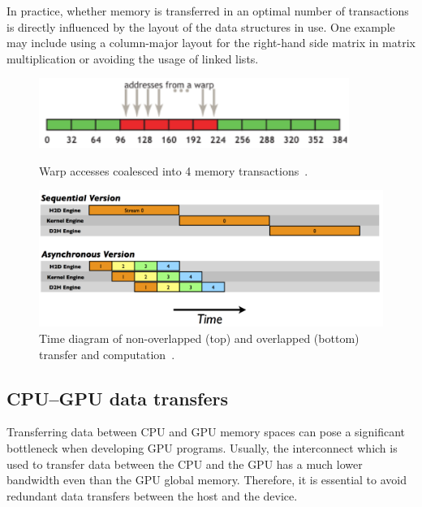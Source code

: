 In practice, whether memory is transferred in an optimal number of transactions is directly influenced by the layout of the data structures in use. One example may include using a column-major layout for the right-hand side matrix in matrix multiplication or avoiding the usage of linked lists.

\begin{figure}[b]
	\centering
	\begin{minipage}{.5\textwidth}
        \centering
        \includegraphics[width=0.9\textwidth]{img/coal1}
        \caption{Warp accesses coalesced into 4 memory transactions~\cite{site:cuda}.}
        \label{fig:coal}
	\end{minipage}%
	\begin{minipage}{.5\textwidth}
        \centering
        \includegraphics[width=\textwidth]{img/C2050Timeline-1024x670.png}
        \caption{Time diagram of non-overlapped (top) and overlapped (bottom) transfer and computation~\cite{site:stream}.}
        \label{fig:transfer}
	\end{minipage}
\end{figure}

\subsection{CPU--GPU data transfers}
\label{sec:transfers}

Transferring data between CPU and GPU memory spaces can pose a significant bottleneck when developing GPU programs. Usually, the interconnect which is used to transfer data between the CPU and the GPU has a much lower bandwidth even than the GPU global memory. Therefore, it is essential to avoid redundant data transfers between the host and the device.

